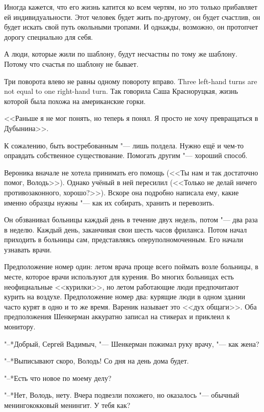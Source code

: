 Иногда кажется, что его жизнь катится ко всем чертям, но это только прибавляет ей индивидуальности.
Этот человек будет жить по-другому, он будет счастлив, он будет искать свой путь окольными тропами.
И однажды, возможно, он протопчет дорогу специально для себя.

А люди, которые жили по шаблону, будут несчастны по тому же шаблону.
Потому что счастья по шаблону не бывает.

{Три поворота влево не равны одному повороту вправо.}
{Three left-hand turns are not equal to one right-hand turn.}
Так говорила Саша Красноруцкая, жизнь которой была похожа на американские горки.

<<Раньше я не мог понять, но теперь я понял.
Я просто не хочу превращаться в Дубынина>>.

\textspace

\label{Tue_2012_07_24}

К сожалению, быть востребованным "--- лишь полдела.
Нужно ещё и чем-то оправдать собственное существование.
Помогать другим "--- хороший способ.

Вероника вначале не хотела принимать его помощь (<<Ты нам и так достаточно помог, Володь>>).
Однако учёный в ней пересилил (<<Только не делай ничего противозаконного, хорошо?>>).
Вскоре она подробно написала ему, какие именно образцы нужны "--- как их собирать, хранить и перевозить.

Он обзванивал больницы каждый день в течение двух недель, потом "--- два раза в неделю.
Каждый день, заканчивая свои шесть часов фриланса.
Потом начал приходить в больницы сам, представляясь оперуполномоченным.
Его начали узнавать врачи.

Предположение номер один: летом врача проще всего поймать возле больницы, в месте, которое врачи используют для курения.
Во многих больницах есть неофициальные <<курилки>>, но летом работающие люди предпочитают курить на воздухе.
Предположение номер два: курящие люди в одном здании часто курят в одно и то же время.
Вареник называет это <<дух общаги>>.
Оба предположения Шенкерман аккуратно записал на стикерах и приклеил к монитору.

"--*Добрый, Сергей Вадимыч, "--- Шенкерман пожимал руку врачу, "--- как жена?

"--*Выписывают скоро, Володь!
Со дня на день дома будет.

"--*Есть что новое по моему делу?

"--*Нет, Володь, нету.
Вчера подвезли похожего, но оказалось "--- обычный менингококковый менингит.
У тебя как?


